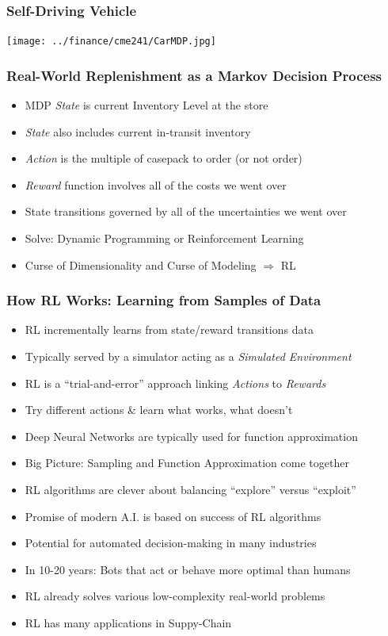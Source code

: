 \documentclass[handout]{beamer}
\begin{document}
\begin{frame}
\frametitle{Self-Driving Vehicle}
\texttt{[image: ../finance/cme241/CarMDP.jpg]}
\end{frame}

\begin{frame}
\frametitle{Real-World Replenishment as a Markov Decision Process}
\pause
\begin{itemize}[<+->]
\item MDP {\em State} is current Inventory Level at the store
\item {\em State} also includes current in-transit inventory
\item {\em Action} is the multiple of casepack to order (or not order)
\item {\em Reward} function involves all of the costs we went over
\item State transitions governed by all of the uncertainties we went over
\item Solve: Dynamic Programming or Reinforcement Learning
\item Curse of Dimensionality and Curse of Modeling $\Rightarrow$ RL
\end{itemize}
\end{frame}


\begin{frame}
\frametitle{How RL Works: Learning from Samples of Data}
\pause
\begin{itemize}[<+->]
\item RL incrementally learns from state/reward transitions data
\item Typically served by a simulator acting as a {\em Simulated Environment}
\item RL is a ``trial-and-error'' approach linking {\em Actions} to {\em Rewards}
\item Try different actions \& learn what works, what doesn't
\item Deep Neural Networks are typically used for function approximation
\item Big Picture: Sampling and Function Approximation come together
\item RL algorithms are clever about balancing  ``explore'' versus ``exploit''
\item Promise of modern A.I. is based on success of RL algorithms
\item Potential for automated decision-making in many industries
\item In 10-20 years: Bots that act or behave more optimal than humans
\item RL already solves various low-complexity real-world problems
\item RL has many applications in Suppy-Chain
\end{itemize}
\end{frame}
\end{document}

